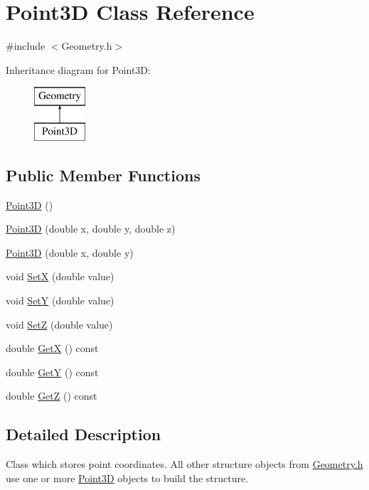 \hypertarget{class_point3_d}{}\section{Point3D Class Reference}
\label{class_point3_d}


{\ttfamily \#include $<$Geometry.\+h$>$}

Inheritance diagram for Point3D\+:\begin{figure}[H]
\begin{center}
\leavevmode
\includegraphics[height=2.000000cm]{class_point3_d}
\end{center}
\end{figure}
\subsection*{Public Member Functions}
\begin{DoxyCompactItemize}
\item 
\hyperlink{class_point3_d_a0e7bbbad6dc4316a9e17d9c4d17c8016}{Point3D} ()
\item 
\hyperlink{class_point3_d_a4ab689160e40d1052d18d4eb96b37419}{Point3D} (double x, double y, double z)
\item 
\hyperlink{class_point3_d_abb578ef0a4d869c60518d03c2850bc86}{Point3D} (double x, double y)
\item 
void \hyperlink{class_point3_d_a49f776d3cf82882d8ea1971cea9ffda3}{SetX} (double value)
\item 
void \hyperlink{class_point3_d_a7d770b248d505057a7ef5c59092ab1e3}{SetY} (double value)
\item 
void \hyperlink{class_point3_d_a2f7667f3e19b8ac1335f50794232a2c5}{SetZ} (double value)
\item 
double \hyperlink{class_point3_d_a38cf0869ef4de11a4f02ad65513c1a4e}{GetX} () const
\item 
double \hyperlink{class_point3_d_a9e0e1e5926240f6ba9a4676586bd574c}{GetY} () const
\item 
double \hyperlink{class_point3_d_af6eb3e13adb7057a54b34a973d430162}{GetZ} () const
\end{DoxyCompactItemize}


\subsection{Detailed Description}
Class which stores point coordinates. All other structure objects from \hyperlink{_geometry_8h_source}{Geometry.\+h} use one or more \hyperlink{class_point3_d}{Point3D} objects to build the structure. 


